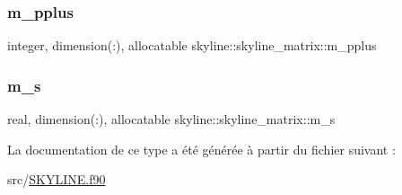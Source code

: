 \subsubsection{\texorpdfstring{m\+\_\+pplus}{m\_pplus}}
{\footnotesize\ttfamily integer, dimension(\+:), allocatable skyline\+::skyline\+\_\+matrix\+::m\+\_\+pplus}

\mbox{\label{structskyline_1_1skyline__matrix_ad8c333b80461be7faf047a603edd445a}} 
\subsubsection{\texorpdfstring{m\+\_\+s}{m\_s}}
{\footnotesize\ttfamily real, dimension(\+:), allocatable skyline\+::skyline\+\_\+matrix\+::m\+\_\+s}



La documentation de ce type a été générée à partir du fichier suivant \+:\begin{DoxyCompactItemize}
\item 
src/\hyperlink{_s_k_y_l_i_n_e_8f90}{S\+K\+Y\+L\+I\+N\+E.\+f90}\end{DoxyCompactItemize}
